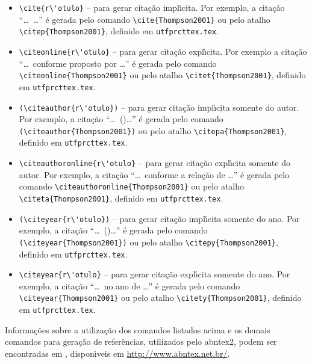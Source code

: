 \begin{itemize}%
\item \verb|\cite{r\'otulo}| -- para gerar cita\c{c}\~ao impl\'{\i}cita. Por exemplo, a cita\c{c}\~ao ``\ldots\ \cite{Thompson2001}\ldots'' \'e gerada pelo comando \verb|\cite{Thompson2001}| ou pelo atalho \verb|\citep{Thompson2001}|, definido em \texttt{utfprcttex.tex}.
\item \verb|\citeonline{r\'otulo}| -- para gerar cita\c{c}\~ao expl\'{\i}cita. Por exemplo a cita\c{c}\~ao ``\ldots\ conforme proposto por \ldots'' \'e gerada pelo comando \verb|\citeonline{Thompson2001}| ou pelo atalho \verb|\citet{Thompson2001}|, definido em \texttt{utfprcttex.tex}.
\item \verb|(\citeauthor{r\'otulo})| -- para gerar cita\c{c}\~ao impl\'{\i}cita somente do autor. Por exemplo, a cita\c{c}\~ao ``\ldots\ (\citeauthor{Thompson2001})\ldots'' \'e gerada pelo comando \verb|(\citeauthor{Thompson2001})| ou pelo atalho \verb|\citepa{Thompson2001}|, definido em \texttt{utfprcttex.tex}.
\item \verb|\citeauthoronline{r\'otulo}| -- para gerar cita\c{c}\~ao expl\'{\i}cita somente do autor. Por exemplo, a cita\c{c}\~ao ``\ldots\ conforme a rela\c{c}\~ao de \ldots'' \'e gerada pelo comando \verb|\citeauthoronline{Thompson2001}| ou pelo atalho \verb|\citeta{Thompson2001}|, definido em \texttt{utfprcttex.tex}.
\item \verb|(\citeyear{r\'otulo})| -- para gerar cita\c{c}\~ao impl\'{\i}cita somente do ano. Por exemplo, a cita\c{c}\~ao ``\ldots\ (\citeyear{Thompson2001})\ldots'' \'e gerada pelo comando \verb|(\citeyear{Thompson2001})| ou pelo atalho \verb|\citepy{Thompson2001}|, definido em \texttt{utfprcttex.tex}.
\item \verb|\citeyear{r\'otulo}| -- para gerar cita\c{c}\~ao expl\'{\i}cita somente do ano. Por exemplo, a cita\c{c}\~ao ``\ldots\ no ano de \citeyear{Thompson2001}\ldots'' \'e gerada pelo comando \verb|\citeyear{Thompson2001}| ou pelo atalho \verb|\citety{Thompson2001}|, definido em \texttt{utfprcttex.tex}.
\end{itemize}

Informa\c{c}\~oes sobre a utiliza\c{c}\~ao dos comandos listados acima e os demais comandos para gera\c{c}\~ao de refer\^encias, utilizados pelo \gls{abntex2}, podem ser encontradas em , dispon\'{\i}veis em \url{http://www.abntex.net.br/}.

